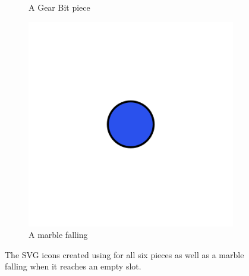 \documentclass{l4proj}
\begin{document}
\begin{figure}
\begin{subfigure}[b]{0.20\textwidth}
        \caption{A Gear Bit piece \\}
        \label{fig:gearbit}
    \end{subfigure}
    \begin{subfigure}[b]{0.20\textwidth}
        \includegraphics[width=\textwidth]{images/blue-marble-fall.png}
        \caption{A marble falling \\}
        \label{fig:marbleFall}
    \end{subfigure}
    \caption{The SVG icons created using \cite{noauthor_method_nodate} for all six pieces as well as a marble falling when it reaches an empty slot.}
    \label{fig:pieces}
\end{figure}
\end{document}
